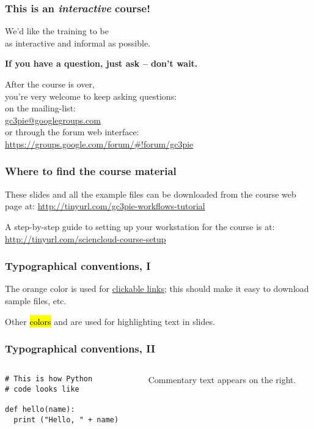 \documentclass[english,serif,mathserif,xcolor=pdftex,dvipsnames,table]{beamer}
\begin{document}
\begin{frame}
  \frametitle{This is an \emph{interactive} course!}
  \begin{center}
    We'd like the training to be \\ as interactive and informal as
    possible.

    \+ \textbf{If you have a question, just ask -- don't wait.}

    \+
    After the course is over, \\ you're very welcome to keep asking questions:
    \\[1ex]
    on the mailing-list: \\
    \href{mailto:gc3pie@googlegroups.com}{gc3pie@googlegroups.com}
    \\[1ex]
    or through the forum web interface: \\ {\small
      \url{https://groups.google.com/forum/\#!forum/gc3pie}}
  \end{center}
\end{frame}


\begin{frame}
  \frametitle{Where to find the course material}

  These slides and all the example files can be downloaded from the
  course web page at:
  {\small\url{http://tinyurl.com/gc3pie-workflows-tutorial}}

  \+
  A step-by-step guide to setting up your workstation for the course is at:
  {\small\url{http://tinyurl.com/sciencloud-course-setup}}
\end{frame}


\begin{frame}
  \frametitle{Typographical conventions, I}

  The orange color is used for
  \href{http://tinyurl.com/gc3pie-july-2016}{clickable
    links}; this should make it easy to download sample files, etc.

  \+
  Other \hl{colors} and  are used for highlighting
  text in slides.
\end{frame}


\begin{frame}[fragile]
  \frametitle{Typographical conventions, II}

    \begin{columns}[t]
    \begin{column}{0.5\textwidth}
\begin{lstlisting}
# This is how Python
# code looks like

def hello(name):
  print ("Hello, " + name)
\end{lstlisting}
    \end{column}
    \begin{column}{0.5\textwidth}
      \raggedleft Commentary text appears on the right.
    \end{column}
  \end{columns}
\end{frame}
\end{document}
